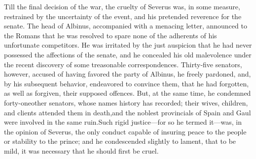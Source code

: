 Till the final decision of the war, the cruelty of Severus was,
in some measure, restrained by the uncertainty of the event, and
his pretended reverence for the senate. The head of Albinus,
accompanied with a menacing letter, announced to the Romans that
he was resolved to spare none of the adherents of his unfortunate
competitors. He was irritated by the just auspicion that he had
never possessed the affections of the senate, and he concealed
his old malevolence under the recent discovery of some
treasonable correspondences. Thirty-five senators, however,
accused of having favored the party of Albinus, he freely
pardoned, and, by his subsequent behavior, endeavored to convince
them, that he had forgotten, as well as forgiven, their supposed
offences. But, at the same time, he condemned forty-one\footnotemark[57] other
senators, whose names history has recorded; their wives,
children, and clients attended them in death,\footnotemark[571] and the noblest
provincials of Spain and Gaul were involved in the same ruin.\footnotemark[572]
Such rigid justice—for so he termed it—was, in the opinion of
Severus, the only conduct capable of insuring peace to the people
or stability to the prince; and he condescended slightly to
lament, that to be mild, it was necessary that he should first be
cruel.\footnotemark[58]




